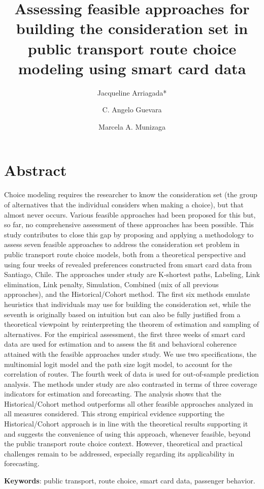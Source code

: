 \documentclass[12pt,a4paper]{article}
\title{\bfseries \normalsize Assessing feasible approaches for building the consideration set in public transport route choice modeling using smart card data}
\author[1]{Jacqueline Arriagada*}
\author[2]{C. Angelo Guevara}
\author[3]{Marcela A. Munizaga}
\affil[1]{Departamento de Ingenier\'ia Civil Industrial, Universidad de Chile, Santiago, Chile.}
\affil[2,3]{Departamento de Ingenier\'ia Civil, Universidad de Chile, Santiago, Chile}
\affil[2,3]{Instituto Sistemas Complejos de Ingenier\'ia (ISCI)}
\date{\vspace{-5ex}}
\begin{document}
\maketitle
\section*{Abstract}
\small
Choice modeling requires the researcher to know the consideration set (the group of alternatives that the individual considers when making a choice), but that almost never occurs. Various feasible approaches had been proposed for this but, so far, no comprehensive assessment of these approaches has been possible. This study contributes to close this gap by proposing and applying a methodology to assess seven feasible approaches to address the consideration set problem in public transport route choice models, both from a theoretical perspective and using four weeks of revealed preferences constructed from smart card data from Santiago, Chile. The approaches under study are K-shortest paths, Labeling, Link elimination, Link penalty, Simulation, Combined (mix of all previous approaches), and the Historical/Cohort method. The first six methods emulate heuristics that individuals may use for building the consideration set, while the seventh is originally based on intuition but can also be fully justified from a theoretical viewpoint by reinterpreting the theorem of estimation and sampling of alternatives. For the empirical assessment, the first three weeks of smart card data are used for estimation and to assess the fit and behavioral coherence attained with the feasible approaches under study. We use two specifications, the multinomial logit model and the path size logit model, to account for the correlation of routes. The fourth week of data is used for out-of-sample prediction analysis. The methods under study are also contrasted in terms of three coverage indicators for estimation and forecasting. The analysis shows that the Historical/Cohort method outperforms all other feasible approaches analyzed in all measures considered. This strong empirical evidence supporting the Historical/Cohort approach is in line with the theoretical results supporting it and suggests the convenience of using this approach, whenever feasible, beyond the public transport route choice context. However, theoretical and practical challenges remain to be addressed, especially regarding its applicability in forecasting.

\textbf{Keywords}: public transport, route choice, smart card data, passenger behavior.
\end{document}
